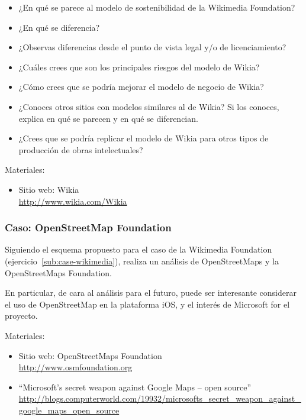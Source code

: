 \documentclass[a4paper,12pt]{article}
\begin{document}
\begin{itemize}
\item ¿En qué se parece al modelo de sostenibilidad de la Wikimedia Foundation?
\item ¿En qué se diferencia?
\item ¿Observas diferencias desde el punto de vista legal y/o de licenciamiento?
\item ¿Cuáles crees que son los principales riesgos del modelo de Wikia?
\item ¿Cómo crees que se podría mejorar el modelo de negocio de Wikia?
\item ¿Conoces otros sitios con modelos similares al de Wikia? Si los conoces, explica en qué se parecen y en qué se diferencian.
\item ¿Crees que se podría replicar el modelo de Wikia para otros tipos de producción de obras intelectuales? 
\end{itemize}

Materiales:

\begin{itemize}
\item Sitio web: Wikia \\
  \url{http://www.wikia.com/Wikia}
\end{itemize}

\subsubsection{Caso: OpenStreetMap Foundation}
\label{sub:case-openstreetmap}

Siguiendo el esquema propuesto para el caso de la Wikimedia Foundation (ejercicio~\ref{sub:case-wikimedia}), realiza un análisis de OpenStreetMaps y la OpenStreetMaps Foundation.

En particular, de cara al análisis para el futuro, puede ser interesante considerar el uso de OpenStreetMap en la plataforma iOS, y el interés de Microsoft for el proyecto.

Materiales:

\begin{itemize}
\item Sitio web: OpenStreetMaps Foundation \\
  \url{http://www.osmfoundation.org}
\item ``Microsoft's secret weapon against Google Maps -- open source'' \\
  \url{http://blogs.computerworld.com/19932/microsofts_secret_weapon_against_google_maps_open_source}
\end{itemize}
\end{document}
